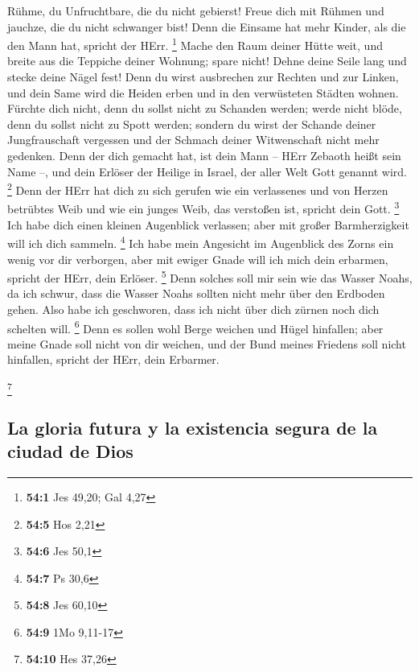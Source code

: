  Rühme, du Unfruchtbare, die du nicht gebierst! Freue dich
mit Rühmen und jauchze, die du nicht schwanger bist! Denn die Einsame
hat mehr Kinder, als die den Mann hat, spricht der HErr. \footnote{\textbf{54:1}
  Jes 49,20; Gal 4,27}  Mache den Raum deiner Hütte weit,
und breite aus die Teppiche deiner Wohnung; spare nicht! Dehne deine
Seile lang und stecke deine Nägel fest!  Denn du wirst
ausbrechen zur Rechten und zur Linken, und dein Same wird die Heiden
erben und in den verwüsteten Städten wohnen.  Fürchte dich
nicht, denn du sollst nicht zu Schanden werden; werde nicht blöde, denn
du sollst nicht zu Spott werden; sondern du wirst der Schande deiner
Jungfrauschaft vergessen und der Schmach deiner Witwenschaft nicht mehr
gedenken.  Denn der dich gemacht hat, ist dein Mann --
HErr Zebaoth heißt sein Name --, und dein Erlöser der Heilige in Israel,
der aller Welt Gott genannt wird. \footnote{\textbf{54:5} Hos 2,21}
 Denn der HErr hat dich zu sich gerufen wie ein
verlassenes und von Herzen betrübtes Weib und wie ein junges Weib, das
verstoßen ist, spricht dein Gott. \footnote{\textbf{54:6} Jes 50,1}
 Ich habe dich einen kleinen Augenblick verlassen; aber
mit großer Barmherzigkeit will ich dich sammeln. \footnote{\textbf{54:7}
  Ps 30,6}  Ich habe mein Angesicht im Augenblick des
Zorns ein wenig vor dir verborgen, aber mit ewiger Gnade will ich mich
dein erbarmen, spricht der HErr, dein Erlöser. \footnote{\textbf{54:8}
  Jes 60,10}  Denn solches soll mir sein wie das Wasser
Noahs, da ich schwur, dass die Wasser Noahs sollten nicht mehr über den
Erdboden gehen. Also habe ich geschworen, dass ich nicht über dich
zürnen noch dich schelten will. \footnote{\textbf{54:9} 1Mo 9,11-17}
 Denn es sollen wohl Berge weichen und Hügel hinfallen;
aber meine Gnade soll nicht von dir weichen, und der Bund meines
Friedens soll nicht hinfallen, spricht der HErr, dein Erbarmer.

\footnote{\textbf{54:10} Hes 37,26}

\hypertarget{la-gloria-futura-y-la-existencia-segura-de-la-ciudad-de-dios}{%
\subsection{La gloria futura y la existencia segura de la ciudad de
Dios}\label{la-gloria-futura-y-la-existencia-segura-de-la-ciudad-de-dios}}

